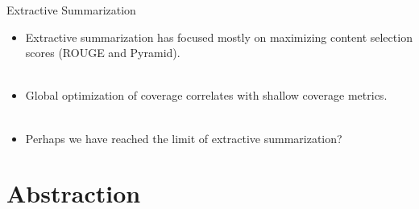 \documentclass[xcolor={table}]{beamer}
\begin{document}
\begin{frame}{Extractive Summarization}

 \begin{itemize}
  \item Extractive summarization has focused mostly on maximizing content
    selection scores (ROUGE and Pyramid).
~\\
~\\
  \item Global optimization of coverage correlates with shallow coverage 
        metrics.
~\\
~\\
  \item Perhaps we have reached the limit of extractive summarization? 
 \end{itemize}

\end{frame}

\section{Abstraction}
\end{document}
